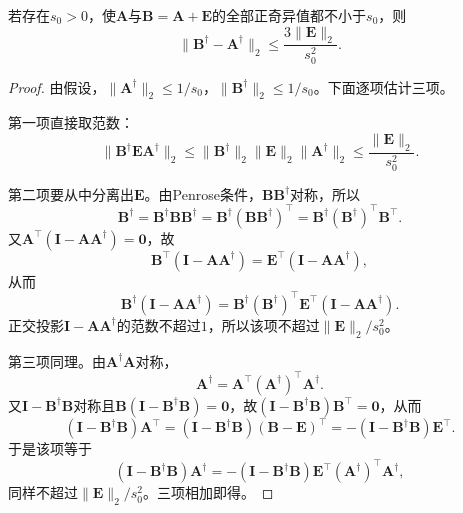 \begin{theorem}[伪逆的扰动界]
\label{thm:ls-pseudoinverse-perturbation}
若存在$s_0>0$，使$\bm A$与$\bm B=\bm A+\bm E$的全部正奇异值都不小于$s_0$，则
\begin{equation}
 \lVert\bm B^\dagger-\bm A^\dagger\rVert_2\leq\frac{3\lVert\bm E\rVert_2}{s_0^2}.
 \label{eq:ch06-pseudoinverse-fixed-rank-perturbation}
\end{equation}
\end{theorem}
\begin{proof}
由假设，$\lVert\bm A^\dagger\rVert_2\leq1/s_0$，$\lVert\bm B^\dagger\rVert_2\leq1/s_0$。下面逐项估计三项。

第一项直接取范数：
\[
 \lVert\bm B^\dagger\bm E\bm A^\dagger\rVert_2\leq\lVert\bm B^\dagger\rVert_2\lVert\bm E\rVert_2\lVert\bm A^\dagger\rVert_2\leq\frac{\lVert\bm E\rVert_2}{s_0^2}.
\]

第二项要从中分离出$\bm E$。由Penrose条件，$\bm B\bm B^\dagger$对称，所以
\[
 \bm B^\dagger=\bm B^\dagger\bm B\bm B^\dagger=\bm B^\dagger(\bm B\bm B^\dagger)^\top=\bm B^\dagger(\bm B^\dagger)^\top\bm B^\top .
\]
又$\bm A^\top(\bm I-\bm A\bm A^\dagger)=\bm0$，故
\[
 \bm B^\top(\bm I-\bm A\bm A^\dagger)=\bm E^\top(\bm I-\bm A\bm A^\dagger),
\]
从而
\[
 \bm B^\dagger(\bm I-\bm A\bm A^\dagger)=\bm B^\dagger(\bm B^\dagger)^\top\bm E^\top(\bm I-\bm A\bm A^\dagger).
\]
正交投影$\bm I-\bm A\bm A^\dagger$的范数不超过$1$，所以该项不超过$\lVert\bm E\rVert_2/s_0^2$。

第三项同理。由$\bm A^\dagger\bm A$对称，
\[
 \bm A^\dagger=\bm A^\top(\bm A^\dagger)^\top\bm A^\dagger .
\]
又$\bm I-\bm B^\dagger\bm B$对称且$\bm B(\bm I-\bm B^\dagger\bm B)=\bm0$，故$(\bm I-\bm B^\dagger\bm B)\bm B^\top=\bm0$，从而
\[
 (\bm I-\bm B^\dagger\bm B)\bm A^\top=(\bm I-\bm B^\dagger\bm B)(\bm B-\bm E)^\top=-(\bm I-\bm B^\dagger\bm B)\bm E^\top .
\]
于是该项等于
\[
 (\bm I-\bm B^\dagger\bm B)\bm A^\dagger=-(\bm I-\bm B^\dagger\bm B)\bm E^\top(\bm A^\dagger)^\top\bm A^\dagger ,
\]
同样不超过$\lVert\bm E\rVert_2/s_0^2$。三项相加即得。
\end{proof}

